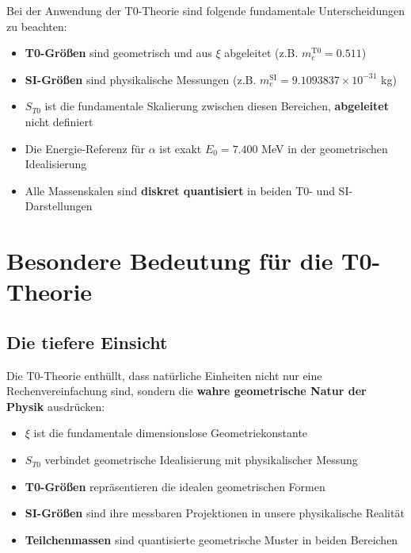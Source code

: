 \documentclass[12pt,a4paper]{article}
\begin{document}
	Bei der Anwendung der T0-Theorie sind folgende fundamentale Unterscheidungen zu beachten:
	
	\begin{itemize}
		\item \textbf{T0-Größen} sind geometrisch und aus $\xi$ abgeleitet (z.B. $m_e^{\mathrm{T0}} = 0.511$)
		\item \textbf{SI-Größen} sind physikalische Messungen (z.B. $m_e^{\mathrm{SI}} = 9.1093837\times 10^{-31}$ kg)
		\item \textbf{$S_{T0}$} ist die fundamentale Skalierung zwischen diesen Bereichen, \textbf{abgeleitet} nicht definiert
		\item Die Energie-Referenz für $\alpha$ ist exakt $E_0 = 7.400$ MeV in der geometrischen Idealisierung
		\item Alle Massenskalen sind \textbf{diskret quantisiert} in beiden T0- und SI-Darstellungen
	\end{itemize}
	
	\section{Besondere Bedeutung für die T0-Theorie}
	
	\subsection{Die tiefere Einsicht}
	Die T0-Theorie enthüllt, dass natürliche Einheiten nicht nur eine Rechenvereinfachung sind, sondern die \textbf{wahre geometrische Natur der Physik} ausdrücken:
	\begin{itemize}
		\item \textbf{$\xi$} ist die fundamentale dimensionslose Geometriekonstante
		\item \textbf{$S_{T0}$} verbindet geometrische Idealisierung mit physikalischer Messung
		\item \textbf{T0-Größen} repräsentieren die idealen geometrischen Formen
		\item \textbf{SI-Größen} sind ihre messbaren Projektionen in unsere physikalische Realität
		\item \textbf{Teilchenmassen} sind quantisierte geometrische Muster in beiden Bereichen
	\end{itemize}
	
\end{document}
